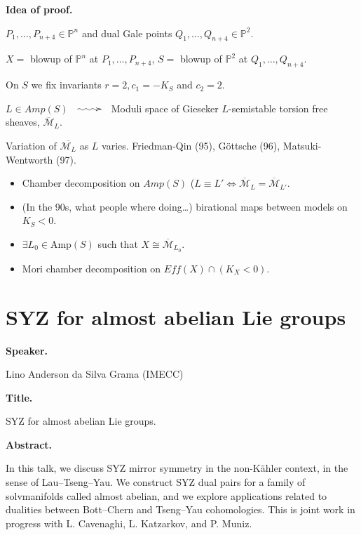 \medskip\noindent
{\bf Idea of proof.} 

$P_1,…,P_{n+4} \in \mathbb{P}^n$
and dual Gale points $Q_1,…,Q_{n+4} 
\in \mathbb{P}^2$.

$X =$ blowup of $\mathbb{P}^n$ at $
P_1,…,P_{n+4}$,
$S = $ blowup of $\mathbb{P}^2$ at
$Q_1,…,Q_{n+4}$.

On $S$ we fix invariants $r=2, c_1=-K_S$
and $c_2=2$.

$L \in Amp(S)$ $\xymatrix{\ar@{~>}[r]&}$
Moduli space of Gieseker $L$-semistable
torsion free sheaves,
$\overline{\mathcal{M}}_L$.

Variation of $\overline{\mathcal{M}_L}$
as $L$ varies.
Friedman-Qin (95), Göttsche (96),
Matsuki-Wentworth (97).

\begin{itemize}
\item Chamber decomposition on 
$Amp(S)$ ($L \equiv L' \iff
\overline{\mathcal{M}}_L =
\overline{\mathcal{M}}_{L'}$.
\item (In the 90s, what people
where doing…) birational maps
between models on $K_S <0$.
\end{itemize}

\begin{theorem}
\label{theorem-ackm}
\begin{itemize}
\item $\exists L_0 \in \text{Amp}(S)$
such that $X \cong \overline{
\mathcal{M}}_{L_0}$.
\item Mori chamber decomposition on
$Eff(X) \cap (K_X<0)$.
\end{itemize}
\end{theorem}

\section{SYZ for almost abelian
Lie groups}
\label{section-lino}

\medskip\noindent
{\bf Speaker.}

Lino Anderson da Silva Grama
(IMECC)

\medskip\noindent
{\bf Title.}

SYZ for almost abelian Lie groups.

\medskip\noindent
{\bf Abstract.}

In this talk, we discuss SYZ mirror
symmetry in the non-K\"ahler context,
in the sense of Lau--Tseng--Yau.
We construct SYZ dual pairs for a
family of solvmanifolds called almost
abelian, and we explore applications
related to dualities between
Bott--Chern and Tseng--Yau
cohomologies.
This is joint work in progress with
L. Cavenaghi, L. Katzarkov, and
P. Muniz.


